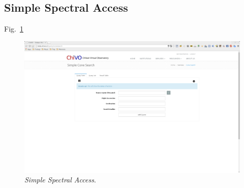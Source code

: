 \subsection{Simple Spectral Access}

Fig.~\ref{img:ssa}

\begin{figure}[ht!]
    \begin{center}
	\includegraphics[scale=.2]{img/ssa}
    \end{center}
    \caption{\emph{Simple Spectral Access}.}\label{img:ssa}
\end{figure}

